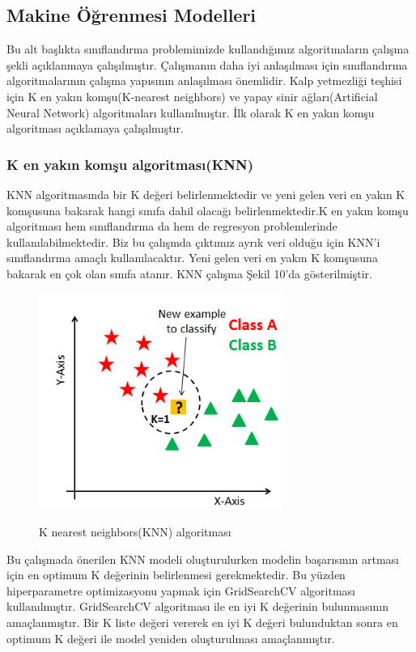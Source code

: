 \documentclass[conference]{IEEEtran}
\begin{document}
\subsection{Makine Öğrenmesi Modelleri}
Bu alt başlıkta sınıflandırma problemimizde kullandığımız algoritmaların çalışma şekli açıklanmaya çalışılmıştır. Çalışmanın daha iyi anlaşılması için sınıflandırma algoritmalarının çalışma yapısının anlaşılması önemlidir. Kalp yetmezliği teşhisi için K en yakın komşu(K-nearest neighbors) ve yapay sinir ağları(Artificial Neural Network) algoritmaları kullanılmıştır. İlk olarak K en yakın komşu algoritması açıklamaya çalışılmıştır.
\subsubsection{K en yakın komşu algoritması(KNN)}
KNN algoritmasında bir K değeri belirlenmektedir ve yeni gelen veri en yakın K komşusuna bakarak hangi sınıfa dahil olacağı belirlenmektedir.K en yakın komşu algoritması hem sınıflandırma da hem de regresyon problemlerinde kullanılabilmektedir. Biz bu çalışmda çıktımız ayrık veri olduğu için KNN'i sınıflandırma amaçlı kullanılacaktır. Yeni gelen veri en yakın K komşusuna bakarak en çok olan sınıfa atanır. KNN çalışma Şekil 10'da gösterilmiştir.
\begin{figure}[htbp]
    \centering
   	\includegraphics[width=8cm]{images/knnresim.PNG}\\
	\caption{K nearest neighbors(KNN) algoritması\cite{resimknn}}
    \label{fig}
\end{figure}
Bu çalışmada önerilen KNN modeli oluşturulurken modelin başarısının artması için en optimum K değerinin belirlenmesi gerekmektedir. Bu yüzden hiperparametre optimizasyonu yapmak için GridSearchCV algoritması kullanılmıştır. GridSearchCV algoritması ile en iyi K değerinin bulunmasının amaçlanmıştır. Bir K liste değeri vererek en iyi K değeri bulunduktan sonra en optimum K değeri ile model yeniden oluşturulması amaçlanmıştır.
\end{document}
